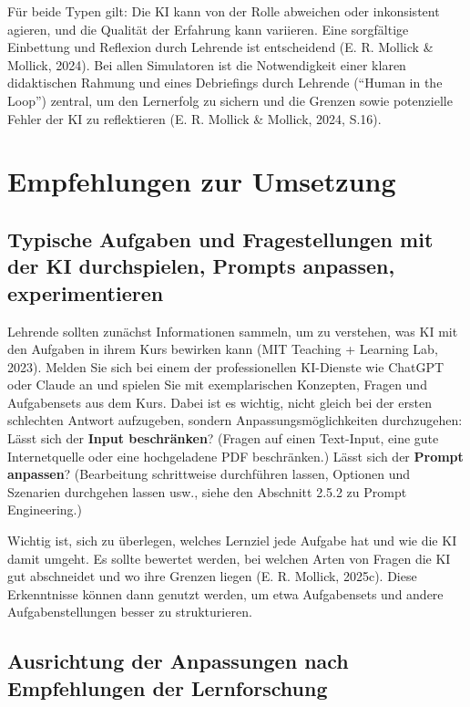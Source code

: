 \documentclass[
  ngerman,
  letterpaper,
  DIV=11]{scrreprt}
\begin{document}
Für beide Typen gilt: Die KI kann von der Rolle abweichen oder
inkonsistent agieren, und die Qualität der Erfahrung kann variieren.
Eine sorgfältige Einbettung und Reflexion durch Lehrende ist
entscheidend (E. R. Mollick \& Mollick, 2024). Bei allen Simulatoren ist
die Notwendigkeit einer klaren didaktischen Rahmung und eines
Debriefings durch Lehrende (``Human in the Loop'') zentral, um den
Lernerfolg zu sichern und die Grenzen sowie potenzielle Fehler der KI zu
reflektieren (E. R. Mollick \& Mollick, 2024, S.16).


\chapter{Empfehlungen zur Umsetzung}\label{sec-umsetzung}

\section{Typische Aufgaben und Fragestellungen mit der KI durchspielen,
Prompts anpassen,
experimentieren}\label{typische-aufgaben-und-fragestellungen-mit-der-ki-durchspielen-prompts-anpassen-experimentieren}

Lehrende sollten zunächst Informationen sammeln, um zu verstehen, was KI
mit den Aufgaben in ihrem Kurs bewirken kann (MIT Teaching + Learning
Lab, 2023). Melden Sie sich bei einem der professionellen KI-Dienste wie
ChatGPT oder Claude an und spielen Sie mit exemplarischen Konzepten,
Fragen und Aufgabensets aus dem Kurs. Dabei ist es wichtig, nicht gleich
bei der ersten schlechten Antwort aufzugeben, sondern
Anpassungsmöglichkeiten durchzugehen: Lässt sich der \textbf{Input
beschränken}? (Fragen auf einen Text-Input, eine gute Internetquelle
oder eine hochgeladene PDF beschränken.) Lässt sich der \textbf{Prompt
anpassen}? (Bearbeitung schrittweise durchführen lassen, Optionen und
Szenarien durchgehen lassen usw., siehe den Abschnitt 2.5.2 zu Prompt
Engineering.)

Wichtig ist, sich zu überlegen, welches Lernziel jede Aufgabe hat und
wie die KI damit umgeht. Es sollte bewertet werden, bei welchen Arten
von Fragen die KI gut abschneidet und wo ihre Grenzen liegen (E. R.
Mollick, 2025c). Diese Erkenntnisse können dann genutzt werden, um etwa
Aufgabensets und andere Aufgabenstellungen besser zu strukturieren.

\section{Ausrichtung der Anpassungen nach Empfehlungen der
Lernforschung}\label{ausrichtung-der-anpassungen-nach-empfehlungen-der-lernforschung}
\end{document}
